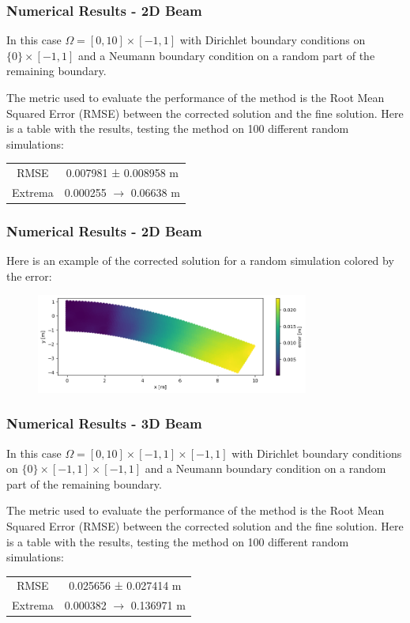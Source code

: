 \documentclass{beamer}
\begin{document}
\begin{frame}
    \frametitle{Numerical Results - 2D Beam}
    In this case \( \Omega = [0, 10] \times [-1, 1] \) with Dirichlet boundary conditions on \(\{0\} \times [-1, 1]\) and a Neumann boundary condition on a random part of the remaining boundary.
    \vspace{0.5cm}

    The metric used to evaluate the performance of the method is the Root Mean Squared Error (RMSE) between the corrected solution and the fine solution.
    Here is a table with the results, testing the method on 100 different random simulations:
    \begin{table}
        \centering
        \begin{tabular}{|c|c|}
            \hline
            RMSE & 0.007981 ± 0.008958 m \\
            Extrema & 0.000255 \(\rightarrow\) 0.06638 m \\
            \hline
        \end{tabular}
    \end{table}
\end{frame}

\begin{frame}
    \frametitle{Numerical Results - 2D Beam}
    Here is an example of the corrected solution for a random simulation colored by the error:
    \begin{figure}
        \centering
        \includegraphics[width=0.8\textwidth]{Images/output_2D_beam.png}
    \end{figure}
\end{frame}

\begin{frame}
    \frametitle{Numerical Results - 3D Beam}
    In this case \( \Omega = [0, 10] \times [-1, 1] \times [-1, 1] \) with Dirichlet boundary conditions on \(\{0\} \times [-1, 1] \times [-1, 1]\) and a Neumann boundary condition on a random part of the remaining boundary.
    \vspace{0.5cm}

    The metric used to evaluate the performance of the method is the Root Mean Squared Error (RMSE) between the corrected solution and the fine solution.
    Here is a table with the results, testing the method on 100 different random simulations:
    \begin{table}
        \centering
        \begin{tabular}{|c|c|}
            \hline
            RMSE & 0.025656 ± 0.027414 m \\
            Extrema & 0.000382 \(\rightarrow\) 0.136971 m \\
            \hline
        \end{tabular}
    \end{table}
\end{frame}
\end{document}
